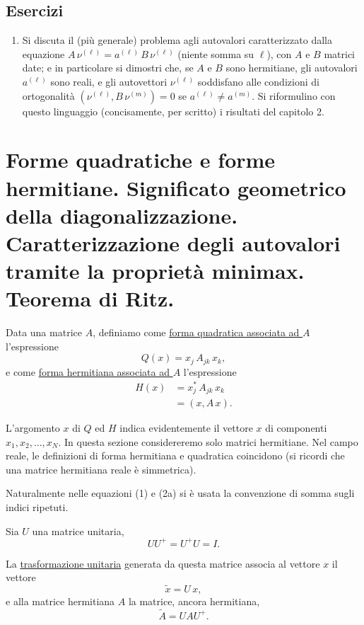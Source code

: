 \documentclass[11pt, a4paper]{book}
\numberwithin{equation}{section}
\newenvironment{esercizi}{\subsection*{Esercizi}\begin{enumerate}}{\end{enumerate}}
\begin{document}
\begin{esercizi}
\item Si discuta il (più generale) problema agli autovalori caratterizzato
dalla equazione $A\,\nu^{(\ell)} = a^{(\ell)}\,B\,\nu^{(\ell)}$ (niente
somma su $\ell$), con $A$ e $B$ matrici date; e in particolare si dimostri
che, se $A$ e $B$ sono hermitiane, gli autovalori $a^{(\ell)}$ sono reali,
e gli autovettori $\nu^{(\ell)}$ soddisfano alle condizioni di ortogonalità
$(\nu^{(\ell)}, B\,\nu^{(m)}) = 0$ se $a^{(\ell)} \neq a^{(m)}$. Si
riformulino con questo linguaggio (concisamente, per scritto) i risultati
del capitolo 2.

\end{esercizi}

\section[forme quadratiche ed hermittiane, minimax, ritz]{Forme quadratiche e forme hermitiane. Significato geometrico
della diagonalizzazione. Caratterizzazione degli autovalori tramite la
proprietà minimax. Teorema di Ritz.}

Data una matrice $A$, definiamo come \uline{forma quadratica associata
ad $A$} l'espressione
\begin{equation}
Q(x) = x_j\,A_{jk}\,x_k,
\end{equation}
e come \uline{forma hermitiana associata ad $A$} l'espressione
\begin{align}
H(x) &= x_j^*\,A_{jk}\,x_k \tag{2a} \\
     &= (x, A\,x). \tag{2b}
\end{align}

L'argomento $x$ di $Q$ ed $H$ indica evidentemente il vettore $x$ di
componenti $x_1, x_2, \ldots, x_N$. In questa sezione considereremo solo
matrici hermitiane. Nel campo reale, le definizioni di forma hermitiana e
quadratica coincidono (si ricordi che una matrice hermitiana reale è
simmetrica).

Naturalmente nelle equazioni (1) e (2a) si è usata la convenzione di somma
sugli indici ripetuti.

Sia $U$ una matrice unitaria,
\begin{equation}
UU^+ = U^+U = I.
\end{equation}

La \uline{trasformazione unitaria} generata da questa matrice associa
al vettore $x$ il vettore
\begin{equation}
\widetilde{x} = U\,x,
\end{equation}
e alla matrice hermitiana $A$ la matrice, ancora hermitiana,
\begin{equation}
\widetilde{A} = UAU^+.
\end{equation}
\end{document}
